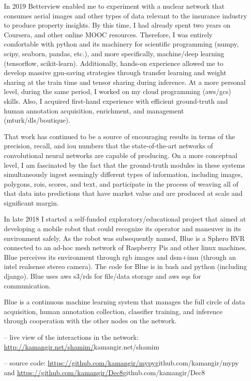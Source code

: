 \osspacing
In 2019 Betterview enabled me to experiment with a nuclear network that consumes aerial images and other types of data relevant to the insurance industry to produce property insights. By this time, I had already spent two years on Coursera, and other online MOOC resources. Therefore, I was entirely comfortable with python and its machinery for scientific programming (numpy, scipy, seaborn, pandas, etc.), and more specifically, machine/deep learning (tensorflow, scikit-learn). Additionally, hands-on experience allowed me to develop massive gpu-saving strategies through transfer learning and weight sharing at the train time and tensor sharing during inference. At a more personal level, during the same period, I worked on my cloud programming (aws/gcs) skills. Also, I acquired first-hand experience with efficient ground-truth and human annotation acquisition, enrichment, and management (mturk/dls/boutique).

\osspacing
That work has continued to be a source of encouraging results in terms of the precision, recall, and iou numbers that the state-of-the-art networks of convolutional neural networks are capable of producing. On a more conceptual level, I am fascinated by the fact that the ground-truth modules in these systems simultaneously ingest seemingly different types of information, including images, polygons, rois, scores, and text, and participate in the process of weaving all of that data into predictions that have market value and are produced at scale and significant margin.		


\osspacing
In late 2018 I started a self-funded exploratory/educational project that aimed at developing a mobile robot that could recognize its operator and maneuver in its environment safely. As the robot was subsequently named, Blue is a Sphero RVR connected to an ad-hoc mesh network of Raspberry Pis and other linux machines. Blue perceives its environment through rgb images and dsm+imu (through an intel realsense stereo camera). The code for Blue is in bash and python (including django). Blue uses aws s3/rds for file/data storage and aws sqs for communication.

\osspacing
Blue is a continuous machine learning system that manages the full circle of data acquisition, human annotation collection, classifier training, and inference through cooperation with the other nodes on the network. 

-- live view of the interactions in the network: \url{http://kamangir.net/shamim/}{kamangir.net/shamim} 

-- source code: \url{https://github.com/kamangir/mypy}{github.com/kamangir/mypy} and \url{https://github.com/kamangir/Dec8}{github.com/kamangir/Dec8}

